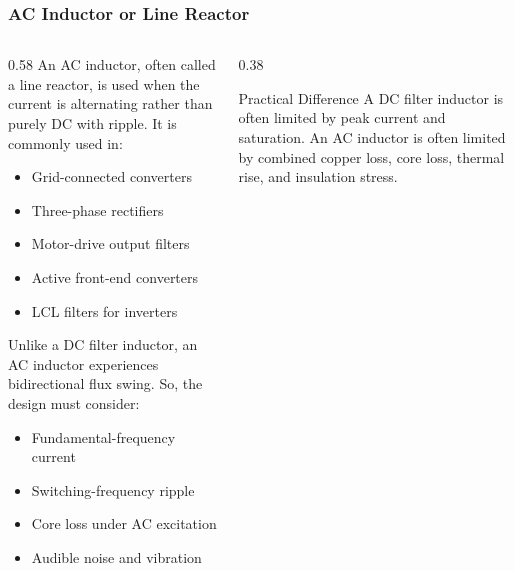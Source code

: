 \begin{frame}
    \frametitle{AC Inductor or Line Reactor}
    \begin{columns}
        \begin{column}{0.58\textwidth}
            An AC inductor, often called a line reactor, is used when the current is alternating rather than purely DC with ripple. It is commonly used in:
            \begin{itemize}
                \item Grid-connected converters
                \item Three-phase rectifiers
                \item Motor-drive output filters
                \item Active front-end converters
                \item LCL filters for inverters
            \end{itemize}
            Unlike a DC filter inductor, an AC inductor experiences bidirectional flux swing. So, the design must consider:
            \begin{itemize}
                \item Fundamental-frequency current
                \item Switching-frequency ripple
                \item Core loss under AC excitation
                \item Audible noise and vibration
            \end{itemize}
        \end{column}

        \begin{column}{0.38\textwidth}
            \begin{block}{Practical Difference}
                A DC filter inductor is often limited by peak current and saturation. An AC inductor is often limited by combined copper loss, core loss, thermal rise, and insulation stress.
            \end{block}
        \end{column}
    \end{columns}
\end{frame}


